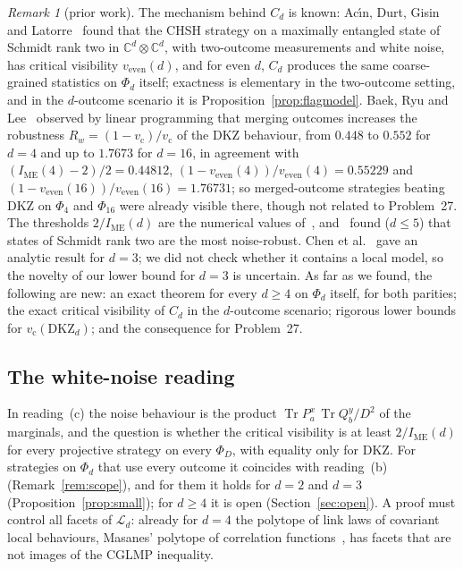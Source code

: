\documentclass[11pt]{article}
\theoremstyle{remark}
\newtheorem{remark}[lemma]{Remark}
\numberwithin{equation}{section}
\newcommand{\C}{\mathbb{C}}
\newcommand{\Tr}{\operatorname{Tr}}
\newcommand{\IME}{I_{\mathrm{ME}}}
\newcommand{\cL}{\mathcal{L}}
\newcommand{\vc}{v_{\mathrm c}}
\newcommand{\veven}{v_{\mathrm{even}}}
\newcommand{\DKZ}{\mathrm{DKZ}}
\begin{document}
\begin{remark}[prior work]\label{rem:literalcredit}
The mechanism behind $C_d$ is known: Ac\'{\i}n, Durt, Gisin and Latorre~\cite[eq.~(14)]{ADGL} found that the CHSH
strategy on a maximally entangled state of Schmidt rank two in $\C^d\otimes\C^d$, with two-outcome measurements and white
noise, has critical visibility $\veven(d)$, and for even $d$, $C_d$ produces the same coarse-grained statistics on
$\Phi_d$ itself; exactness is elementary in the two-outcome setting, and in the $d$-outcome scenario it is
Proposition~\ref{prop:flagmodel}. Baek, Ryu and Lee~\cite{BRL} observed by linear programming that merging outcomes
increases the robustness $R_w=(1-\vc)/\vc$ of the DKZ behaviour, from $0.448$ to $0.552$ for $d=4$ and up to $1.7673$
for $d=16$, in agreement with $(\IME(4)-2)/2=0.44812$, $(1-\veven(4))/\veven(4)=0.55229$ and
$(1-\veven(16))/\veven(16)=1.76731$; so merged-outcome strategies beating DKZ on
$\Phi_4$ and $\Phi_{16}$ were already visible there, though not related to Problem~27. The thresholds $2/\IME(d)$ are the
numerical values of~\cite{KGZMZ,DKZ,CGLMP,GLZ}, and~\cite{GLZ} found ($d\le5$) that states of Schmidt rank two are the
most noise-robust. Chen et al.~\cite{Chen01} gave an analytic result for $d=3$; we did not check whether it contains a local model, so the novelty of our lower bound for
$d=3$ is uncertain. As far as we found, the following are new: an exact theorem for every $d\ge4$ on $\Phi_d$ itself,
for both parities; the exact critical visibility of $C_d$ in the $d$-outcome scenario; rigorous lower bounds for
$\vc(\DKZ_d)$; and the consequence for Problem~27.
\end{remark}

\subsection{The white-noise reading}\label{subsec:white}
In reading~(c) the noise behaviour is the product $\Tr P^x_a\,\Tr Q^y_b/D^2$ of the marginals, and the question is
whether the critical visibility is at least $2/\IME(d)$ for every projective strategy on every $\Phi_D$, with equality
only for DKZ. For strategies on $\Phi_d$ that use every outcome it coincides with reading~(b) (Remark~\ref{rem:scope}), and
for them it holds for $d=2$ and $d=3$ (Proposition~\ref{prop:small}); for $d\ge4$ it is open (Section~\ref{sec:open}). A proof must control
all facets of $\cL_d$: already for $d=4$ the polytope of link laws of covariant local behaviours, Masanes' polytope of
correlation functions~\cite{Masanes}, has facets that are not images of the CGLMP inequality.
\end{document}
